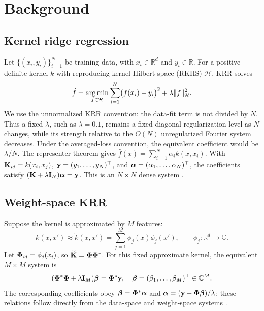 \section{Background}
\label{sec:background}

\subsection{Kernel ridge regression}
Let \(\{(x_i,y_i)\}_{i=1}^N\) be training data, with
\(x_i\in\mathbb R^d\) and \(y_i\in\mathbb R\). For a positive-definite
kernel \(k\) with reproducing kernel Hilbert space (RKHS) \(\mathcal H\),
KRR solves
\[
    \hat f
    = \operatorname*{arg\,min}_{f\in\mathcal H}
    \sum_{i=1}^N \bigl(f(x_i)-y_i\bigr)^2
    +
    \lambda \|f\|_{\mathcal H}^2.
\]
We use the unnormalized KRR convention: the data-fit term is not divided by
\(N\). Thus a fixed \(\lambda\), such as \(\lambda=0.1\), remains a fixed
diagonal regularization level as \(N\) changes, while its strength relative to
the \(O(N)\) unregularized Fourier system decreases. Under the averaged-loss
convention, the equivalent coefficient would be \(\lambda/N\).
The representer theorem gives
\(\hat f(x)=\sum_{i=1}^N\alpha_i k(x,x_i)\). With
\(\mathbf K_{ij}=k(x_i,x_j)\), \(\mathbf y=(y_1,\ldots,y_N)^\top\), and
\(\boldsymbol\alpha=(\alpha_1,\ldots,\alpha_N)^\top\), the coefficients satisfy
\((\mathbf K+\lambda\mathbf I_N)\boldsymbol\alpha=\mathbf y\). This is an \(N\times N\) dense system
\cite{aronszajn1950theory,kimeldorf1971some,scholkopf2001generalized,rasmussen2006gaussian}.
\subsection{Weight-space KRR}
Suppose the kernel is approximated by \(M\) features:
\[
    k(x,x')
    \approx
    \widetilde k(x,x')
    =
    \sum_{j=1}^M \phi_j(x)\overline{\phi_j(x')},
    \qquad \phi_j:\mathbb R^d\to\mathbb C .
\]
Let \(\boldsymbol\Phi_{ij}=\phi_j(x_i)\), so
\(\widetilde{\mathbf K}=\boldsymbol\Phi\boldsymbol\Phi^*\). For this fixed approximate kernel, the
equivalent \(M\times M\) system is
\[
    (\boldsymbol\Phi^*\boldsymbol\Phi+\lambda \mathbf I_M)\boldsymbol\beta=\boldsymbol\Phi^*\mathbf y, \quad
    \boldsymbol\beta=(\beta_1,\ldots,\beta_M)^\top\in\mathbb C^M.
\]
The corresponding coefficients obey \(\boldsymbol\beta=\boldsymbol\Phi^*\boldsymbol\alpha\) and
\(\boldsymbol\alpha=(\mathbf y-\boldsymbol\Phi\boldsymbol\beta)/\lambda\); these relations follow directly
from the data-space and weight-space systems
\cite{rasmussen2006gaussian,greengard2025efgp,barnett2024uniform}.
%
